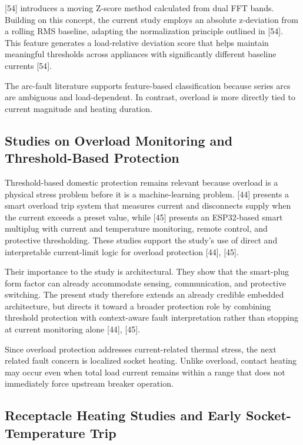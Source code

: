 {[}54{]} introduces a moving Z-score method calculated from dual FFT
bands. Building on this concept, the current study employs an absolute
z-deviation from a rolling RMS baseline, adapting the normalization
principle outlined in {[}54{]}. This feature generates a load-relative
deviation score that helps maintain meaningful thresholds across
appliances with significantly different baseline currents {[}54{]}.

The arc-fault literature supports feature-based classification because
series arcs are ambiguous and load-dependent. In contrast, overload is
more directly tied to current magnitude and heating duration.

\subsection{Studies on Overload Monitoring and Threshold-Based Protection}\label{studies-on-overload-monitoring-and-threshold-based-protection}

Threshold-based domestic protection remains relevant because overload is
a physical stress problem before it is a machine-learning problem.
{[}44{]} presents a smart overload trip system that measures current and
disconnects supply when the current exceeds a preset value, while
{[}45{]} presents an ESP32-based smart multiplug with current and
temperature monitoring, remote control, and protective thresholding.
These studies support the study's use of direct and interpretable
current-limit logic for overload protection {[}44{]}, {[}45{]}.

Their importance to the study is architectural. They show that the
smart-plug form factor can already accommodate sensing, communication,
and protective switching. The present study therefore extends an already
credible embedded architecture, but directs it toward a broader
protection role by combining threshold protection with context-aware
fault interpretation rather than stopping at current monitoring alone
{[}44{]}, {[}45{]}.

Since overload protection addresses current-related thermal stress, the
next related fault concern is localized socket heating. Unlike overload,
contact heating may occur even when total load current remains within a
range that does not immediately force upstream breaker operation.

\subsection{Receptacle Heating Studies and Early Socket-Temperature Trip}\label{receptacle-heating-studies-and-early-socket-temperature-trip}

